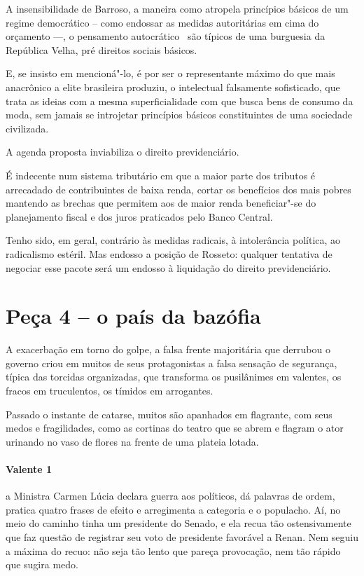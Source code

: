 A insensibilidade de Barroso, a maneira como atropela princípios básicos
de um regime democrático -- como endossar as medidas autoritárias em
cima do orçamento \mbox{---,} o pensamento autocrático~ são típicos de uma
burguesia da República Velha, pré direitos sociais básicos.

E, se insisto em mencioná"-lo, é por ser o representante máximo do que
mais anacrônico a elite brasileira produziu, o intelectual falsamente
sofisticado, que trata as ideias com a mesma superficialidade com que
busca bens de consumo da moda, sem jamais se introjetar princípios
básicos constituintes de uma sociedade civilizada.

A agenda proposta inviabiliza o direito previdenciário.

É indecente num sistema tributário em que a maior parte dos tributos é
arrecadado de contribuintes de baixa renda, cortar os benefícios dos
mais pobres mantendo as brechas que permitem aos de maior renda
beneficiar"-se do planejamento fiscal e dos juros praticados pelo Banco
Central.

Tenho sido, em geral, contrário às medidas radicais, à intolerância
política, ao radicalismo estéril. Mas endosso a posição de Rosseto:
qualquer tentativa de negociar esse pacote será um endosso à liquidação
do direito previdenciário.

\section{Peça 4 -- o país da bazófia}

A exacerbação em torno do golpe, a falsa frente majoritária que derrubou
o governo criou em muitos de seus protagonistas a falsa sensação de
segurança, típica das torcidas organizadas, que transforma os
pusilânimes em valentes, os fracos em truculentos, os tímidos em
arrogantes.

Passado o instante de catarse, muitos são apanhados em flagrante, com
seus medos e fragilidades, como as cortinas do teatro que se abrem e
flagram o ator urinando no vaso de flores na frente de uma plateia
lotada.

\paragraph{\textbf{Valente 1}~~}

a Ministra Carmen Lúcia declara guerra aos políticos, dá palavras de
ordem, pratica quatro frases de efeito e arregimenta a categoria e o
populacho. Aí, no meio do caminho tinha um presidente do Senado, e ela
recua tão ostensivamente que faz questão de registrar seu voto de
presidente favorável a Renan. Nem seguiu a máxima do recuo: não seja tão
lento que pareça provocação, nem tão rápido que sugira medo.

